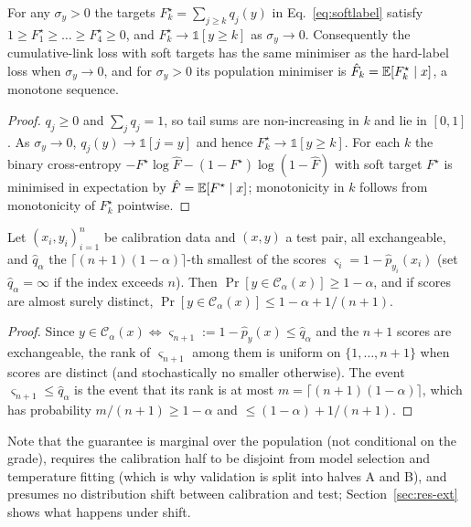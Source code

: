 \begin{proposition}
For any $\sigma_y>0$ the targets $F^\star_k=\sum_{j\ge k}q_j(y)$ in Eq.~\eqref{eq:softlabel} satisfy $1\ge F^\star_1\ge\dots\ge F^\star_4\ge0$, and $F^\star_k\to\mathbb 1[y\ge k]$ as $\sigma_y\to0$. Consequently the cumulative-link loss with soft targets has the same minimiser as the hard-label loss when $\sigma_y\to0$, and for $\sigma_y>0$ its population minimiser is $\hat F_k=\mathbb{E}[F^\star_k\mid x]$, a monotone sequence.
\end{proposition}
\begin{proof}
$q_j\ge0$ and $\sum_jq_j=1$, so tail sums are non-increasing in $k$ and lie in $[0,1]$. As $\sigma_y\to0$, $q_j(y)\to\mathbb 1[j=y]$ and hence $F^\star_k\to\mathbb 1[y\ge k]$. For each $k$ the binary cross-entropy $-F^\star\log\hat F-(1-F^\star)\log(1-\hat F)$ with soft target $F^\star$ is minimised in expectation by $\hat F=\mathbb{E}[F^\star\mid x]$; monotonicity in $k$ follows from monotonicity of $F^\star_k$ pointwise.
\end{proof}

\begin{proposition}
Let $(x_i,y_i)_{i=1}^n$ be calibration data and $(x,y)$ a test pair, all exchangeable, and $\hat q_\alpha$ the $\lceil(n+1)(1-\alpha)\rceil$-th smallest of the scores $\varsigma_i=1-\hat p_{y_i}(x_i)$ (set $\hat q_\alpha=\infty$ if the index exceeds $n$). Then $\Pr[y\in\mathcal C_\alpha(x)]\ge1-\alpha$, and if scores are almost surely distinct, $\Pr[y\in\mathcal C_\alpha(x)]\le1-\alpha+1/(n+1)$.
\end{proposition}
\begin{proof}
Since $y\in\mathcal C_\alpha(x)\iff\varsigma_{n+1}:=1-\hat p_y(x)\le\hat q_\alpha$ and the $n+1$ scores are exchangeable, the rank of $\varsigma_{n+1}$ among them is uniform on $\{1,\dots,n+1\}$ when scores are distinct (and stochastically no smaller otherwise). The event $\varsigma_{n+1}\le\hat q_\alpha$ is the event that its rank is at most $m=\lceil(n+1)(1-\alpha)\rceil$, which has probability $m/(n+1)\ge1-\alpha$ and $\le(1-\alpha)+1/(n+1)$.
\end{proof}
Note that the guarantee is marginal over the population (not conditional on the grade), requires the calibration half to be disjoint from model selection and temperature fitting (which is why validation is split into halves A and B), and presumes no distribution shift between calibration and test; Section~\ref{sec:res-ext} shows what happens under shift.
